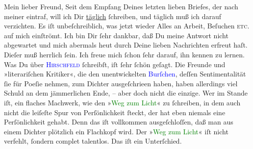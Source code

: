 \pstart\center{}Mein lieber Freund,\pend
\pstart
           Seit dem Empfang Deines letzten lieben Briefes, der nach meiner \label{K_L03204-1v}\label{K_L03204-1h} eintraf, will ich Dir \uline{täglich} ſchreiben, und
               täglich muß ich darauf verzichten. Es iſt unbeſchreiblich, was jetzt wieder Alles an
               Arbeit, Beſuchen \textsc{etc.} auf mich einſtrömt. Ich bin Dir ſehr dankbar, daß Du meine
               Antwort nicht abgewartet und mich abermals heut durch
               Deine lieben Nachrichten erfreut haſt. Dieſer \label{K_L03204-2v}\label{K_L03204-2h} muß herrlich ſein. Ich freue mich ſchon ſehr darauf, ihn kennen zu lernen.
                  {\pb}Was Du über \textsc{\textcolor{blue}{Hirschfeld}{}\ledrightnote{\textcolor{blue}{Georg Hirschfeld}}} ſchreibſt, iſt ſehr ſchön geſagt. Die Freunde und »literariſchen Kritiker«, die
               den unentwickelten \textcolor{blue}{Burſchen}{}\ledrightnote{{$\rightarrow$}\textcolor{blue}{Georg Hirschfeld}}, deſſen Sentimentalität ſie für Poeſie nehmen, zum Dichter
               ausgeſchrieen haben, haben allerdings viel Schuld an dem jämmerlichen Ende, – aber
               doch nicht die einzige. Wer im Stande iſt, ein flaches Machwerk, wie den »\textcolor{green}{Weg zum Licht}{}\ledrightnote{\textcolor{green}{Der Weg zum Licht. Ein Salzburger Märchendrama}}« zu ſchreiben, in dem auch nicht
               die leiſeſte Spur von Perſönlichkeit ſteckt, der hat eben niemals eine Perſönlichkeit
               gehabt. Denn das iſt vollkommen ausgeſchloſſen, daß man aus einem Dichter {\pb}plötzlich ein Flachkopf wird. Der »\textcolor{green}{Weg zum Licht}{}\ledrightnote{\textcolor{green}{Der Weg zum Licht. Ein Salzburger Märchendrama}}« iſt nicht verfehlt, ſondern complet
               talentlos. Das iſt ein Unterſchied.\pend
           
